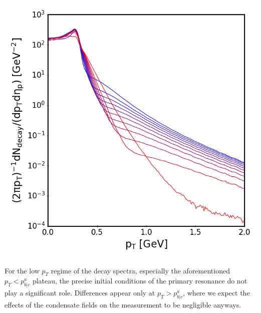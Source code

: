{\begin{minipage}{\linewidth}
{\begin{minipage}{0.45\linewidth}
                \includegraphics[width=\linewidth]{code/C++/DCCspec/images/decaydecay_inittest_decayspecs.png}        
            \end{minipage}
        }
        \label{fig:decayspec_inittest}
    \end{minipage}
}
For the low $p_T$ regime of the decay spectra, especially the aforementioned ${p_T<p^a_{b\vert c}}$ plateau, the precise initial conditions of the primary resonance do not play a significant role. Differences appear only at ${p_T>p^a_{b\vert c}}$, where we expect the effects of the condensate fields on the measurement to be negligible anyways.





